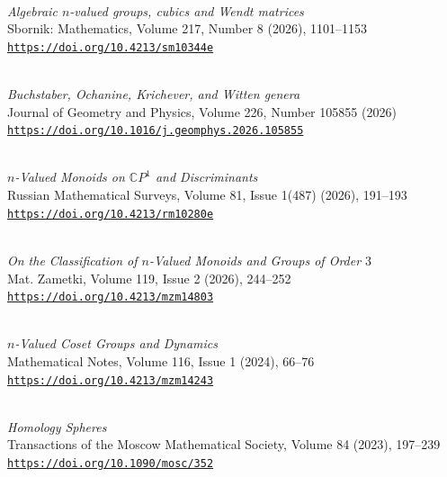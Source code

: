 \documentclass[11pt,letterpaper]{report}
\begin{document}
    \begin{tablist}
         \item[Jul. 2026] \\ {\it Algebraic $n$-valued groups, cubics and Wendt matrices}\\ Sbornik: Mathematics, Volume 217, Number 8 (2026), 1101--1153\\ \href{https://doi.org/10.4213/sm10344e}{\tt https://doi.org/10.4213/sm10344e}
        \item[Apr. 2026] \\ {\it Buchstaber, Ochanine, Krichever, and Witten genera}\\ Journal of Geometry and Physics, Volume 226, Number 105855 (2026)\\ \href{https://doi.org/10.1016/j.geomphys.2026.105855}{\tt https://doi.org/10.1016/j.geomphys.2026.105855}
        \item[Jan. 2026] \\ {\it $n$-Valued Monoids on $\mathbb{C}P^1$ and Discriminants} \\ Russian Mathematical Surveys, Volume 81, Issue 1(487) (2026),  191–193 \\ \href{https://doi.org/10.4213/rm10280e}{\tt https://doi.org/10.4213/rm10280e}
	\item[Jan. 2026] \\ {\it On the Classification of $n$-Valued Monoids and Groups of Order $3$} \\ Mat. Zametki, Volume 119, Issue 2 (2026), 244–252 \\ \href{https://doi.org/10.4213/mzm14803}{\tt https://doi.org/10.4213/mzm14803} 
	\item[Jan. 2024] \\ {\it $n$-Valued Coset Groups and Dynamics}\\ Mathematical Notes, Volume 116, Issue 1 (2024), 66–76 \\ \href{https://doi.org/10.4213/mzm14243}{\tt https://doi.org/10.4213/mzm14243}
        \item[Sep. 2023] \\ {\it Homology Spheres}\\ Transactions of the Moscow Mathematical Society, Volume 84 (2023),  197–239 \href{https://doi.org/10.1090/mosc/352}{\tt https://doi.org/10.1090/mosc/352}
        
    \end{tablist}
    
\end{document}
